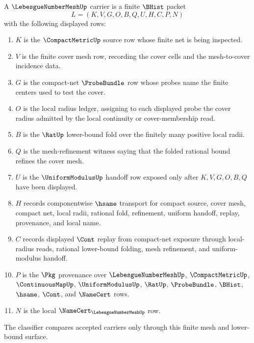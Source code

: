 \begin{definition}
\label{def:lebesgue-number-mesh-carrier}
A $\LebesgueNumberMeshUp$ carrier is a finite $\BHist$ packet
$$
L=(K,V,G,O,B,Q,U,H,C,P,N)
$$
with the following displayed rows:
\begin{enumerate}
\item $K$ is the $\CompactMetricUp$ source row whose finite net is being inspected.
\item $V$ is the finite cover mesh row, recording the cover cells and the mesh-to-cover incidence data.
\item $G$ is the compact-net $\ProbeBundle$ row whose probes name the finite centers used to test the cover.
\item $O$ is the local radius ledger, assigning to each displayed probe the cover radius admitted by the local continuity or cover-membership read.
\item $B$ is the $\RatUp$ lower-bound fold over the finitely many positive local radii.
\item $Q$ is the mesh-refinement witness saying that the folded rational bound refines the cover mesh.
\item $U$ is the $\UniformModulusUp$ handoff row exposed only after $K,V,G,O,B,Q$ have been displayed.
\item $H$ records componentwise $\hsame$ transport for compact source, cover mesh, compact net, local radii, rational fold, refinement, uniform handoff, replay, provenance, and local name.
\item $C$ records displayed $\Cont$ replay from compact-net exposure through local-radius reads, rational lower-bound folding, mesh refinement, and uniform-modulus handoff.
\item $P$ is the $\Pkg$ provenance over $\LebesgueNumberMeshUp$, $\CompactMetricUp$, $\ContinuousMapUp$, $\UniformModulusUp$, $\RatUp$, $\ProbeBundle$, $\BHist$, $\hsame$, $\Cont$, and $\NameCert$ rows.
\item $N$ is the local $\NameCert_{\LebesgueNumberMeshUp}$ row.
\end{enumerate}
The classifier compares accepted carriers only through this finite mesh and lower-bound surface.
\end{definition}

